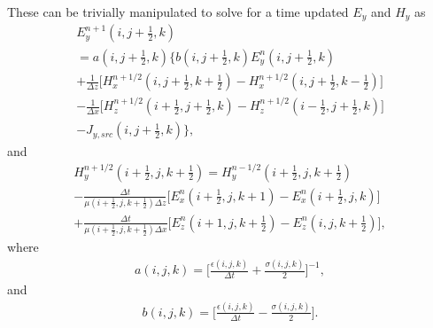 These can be trivially manipulated to solve for a time updated $E_y$ and $H_y$ as
\begin{multline}
	E_y^{n+1}(i,j+\tfrac{1}{2},k)\\ 
	=a(i,j+\tfrac{1}{2},k) \bigg\{b(i,j+\tfrac{1}{2},k)E_y^{n}(i,j+\tfrac{1}{2},k) \\
	 +\frac{1}{\Delta z}\bigg[H_x^{n+1/2}(i,j+\tfrac{1}{2},k+\tfrac{1}{2})-H_x^{n+1/2}(i,j+\tfrac{1}{2},k-\tfrac{1}{2}) \bigg] \\
	 -\frac{1}{\Delta x} \bigg[H_z^{n+1/2}(i+\tfrac{1}{2},j+\tfrac{1}{2},k)-H_z^{n+1/2}(i-\tfrac{1}{2},j+\tfrac{1}{2},k)\bigg] \\
	 -J_{y,src}(i,j+\tfrac{1}{2},k)
	 \bigg\},
	\label{eq:ey-update}
\end{multline}
and
\begin{multline}
	H_y^{n+1/2}(i+\tfrac{1}{2},j,k+\tfrac{1}{2}) = H_y^{n-1/2}(i+\tfrac{1}{2},j,k+\tfrac{1}{2}) \\ 
	-\frac{\Delta t}{\mu(i+\tfrac{1}{2},j,k+\tfrac{1}{2})\Delta z}\bigg[E_x^n(i+\tfrac{1}{2},j,k+1)-E_x^n(i+\tfrac{1}{2},j,k)\bigg] \\
	+\frac{\Delta t}{\mu(i+\tfrac{1}{2},j,k+\tfrac{1}{2})\Delta x}\bigg[E_z^n(i+1,j,k+\tfrac{1}{2})-E_z^n(i,j,k+\tfrac{1}{2})\bigg],
	\label{eq:hy-update}
\end{multline}
where
\begin{align}
	a(i,j,k) = \bigg[\frac{\epsilon(i,j,k)}{\Delta t}+\frac{\sigma(i,j,k)}{2}\bigg]^{-1},
	\label{eq:a}
\end{align}
and
\begin{align}
	b(i,j,k) = \bigg[\frac{\epsilon(i,j,k)}{\Delta t}-\frac{\sigma(i,j,k)}{2}\bigg].
	\label{eq:b}
\end{align}

